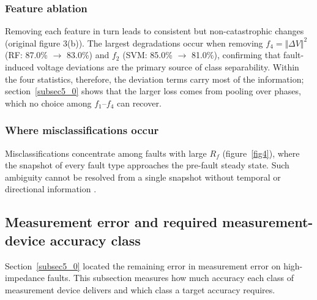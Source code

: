 \documentclass[11pt]{article}
\newenvironment{nw}{}{}
\newcommand{\hlnew}[1]{#1}
\begin{document}
\subsubsection{Feature ablation}\label{subsec5_2}

Removing each feature in turn leads to consistent but non-catastrophic changes \hlnew{(original figure 3(b))}. The largest degradations occur when removing $f_4 = \Vert\Delta V\Vert^{2}$ (RF: 87.0\% $\rightarrow$ 83.0\%) and $f_2$ (SVM: 85.0\% $\rightarrow$ 81.0\%), confirming that fault-induced voltage deviations are the primary source of class separability. \hlnew{Within the four statistics, therefore, the deviation terms carry most of the information; section~\ref{subsec5_0} shows that the larger loss comes from pooling over phases, which no choice among $f_1$--$f_4$ can recover.}

\subsubsection{Where misclassifications occur}\label{subsec5_5}

\begin{nw}
Misclassifications concentrate among faults with large $R_f$ (figure~\ref{fig4}), where the snapshot of every fault type approaches the pre-fault steady state. Such ambiguity cannot be resolved from a single snapshot without temporal or directional information \cite{lotfifard2011,karabulut2025}.
\end{nw}

\begin{nw}
\subsection{Measurement error and required measurement-device accuracy class}\label{subsec5_err}
Section~\ref{subsec5_0} located the remaining error in measurement error on high-impedance faults. This subsection measures how much accuracy each class of measurement device delivers and which class a target accuracy requires.
\end{nw}
\end{document}
